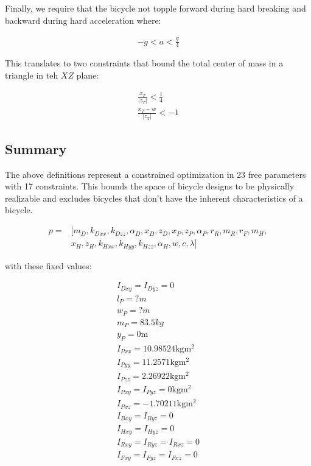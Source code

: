 \documentclass{icsc}
\begin{document}
Finally, we require that the bicycle not topple forward during hard breaking and backward during hard acceleration where:

\begin{align}
  -g < a < \frac{g}{4}
\end{align}

This translates to two constraints that bound the total center of mass in a triangle in teh $XZ$ plane:

\begin{align}
  \frac{x_T}{|z_T|} < \frac{1}{4} \\
  \frac{x_T - w}{|z_T|} < -1
\end{align}

\subsection{Summary}

The above definitions represent a constrained optimization in 23 free parameters with 17 constraints. This bounds the space of bicycle designs to be physically realizable and excludes bicycles that don't have the inherent characteristics of a bicycle.

\begin{align}
  p = & [m_D, k_{Dxx}, k_{Dzz}, \alpha_D, x_D, z_D, x_P, z_P, \alpha_P, r_R, m_R, r_F, m_H, \\
      & x_H, z_H, k_{Hxx}, k_{Hyy}, k_{Hzz}, \alpha_H, w, c, \lambda]
\end{align}

with these fixed values:

\begin{align}
  I_{Dxy} = I_{Dyz} = 0 \\
  l_P = ? \si{m}\\
  w_P = ? \si{m} \\
  m_P = 83.5 \si{kg} \\
  y_P = 0 \si{\meter} \\
  I_{Pxx} = 10.98524 \si{\kg\meter^2} \\
  I_{Pyy} = 11.2571 \si{\kg\meter^2}\\
  I_{Pzz} = 2.26922 \si{\kg\meter^2}\\
  I_{Pxy} = I_{Pyz} = 0 \si{\kg\meter^2}\\
  I_{Pxz} = -1.70211 \si{\kg\meter^2}\\
  I_{Bxy} = I_{Byz} = 0 \\
  I_{Hxy} = I_{Hyz} = 0 \\
  I_{Rxy} = I_{Ryz} = I_{Rxz} = 0 \\
  I_{Fxy} = I_{Fyz} = I_{Fxz} = 0 \\
\end{align}
\end{document}
